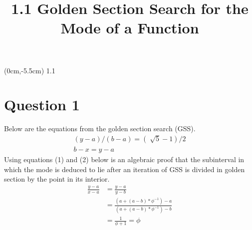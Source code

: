 \documentclass[a4paper]{article}
\title{\vspace*{2cm}1.1 Golden Section Search for the Mode of a Function\vspace*{-1.5cm}}
\date{}
\begin{document}
\maketitle

\begin{textblock*}{100mm}(0cm,-5.5cm)
\Huge 1.1
\end{textblock*}

\section*{Question 1}
Below are the equations from the golden section search (GSS).
\begin{gather}
(y-a)/(b-a) = (\sqrt[]{5}-1)/2 \\
b-x = y-a
\end{gather}
Using equations (1) and (2) below is an algebraic proof that the subinterval in which the mode is deduced to lie after an iteration of GSS is divided in golden section by the point in its interior.
\begin{align*}
\frac{y-a}{x-a} &= \frac{y-a}{y-b} \\
&= \frac{(a+(a-b)*\phi^{-1})-a}{(a+(a-b)*\phi^{-1})-b} \\
&= \frac{1}{\phi +1} = \phi
\end{align*}
\end{document}
